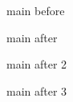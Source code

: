 \documentclass{article}
\begin{document}
main before



main after



main after 2



main after 3
\end{document}
